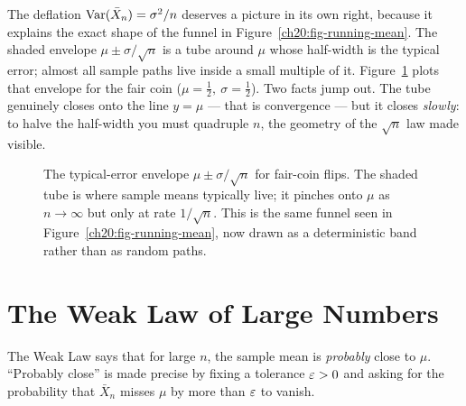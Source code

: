 The deflation $\operatorname{Var}(\bar X_n) = \sigma^2/n$ deserves a picture in its own right, because it explains the exact shape of the funnel in Figure~\ref{ch20:fig-running-mean}. The shaded envelope $\mu \pm \sigma/\sqrt n$ is a tube around $\mu$ whose half-width is the typical error; almost all sample paths live inside a small multiple of it. Figure~\ref{ch20:fig-funnel} plots that envelope for the fair coin ($\mu=\tfrac12,\ \sigma=\tfrac12$). Two facts jump out. The tube genuinely closes onto the line $y=\mu$ --- that is convergence --- but it closes \emph{slowly}: to halve the half-width you must quadruple $n$, the geometry of the $\sqrt n$ law made visible.

\begin{figure}[H]
\centering
{}
\caption{The typical-error envelope $\mu \pm \sigma/\sqrt n$ for fair-coin flips. The shaded tube is where sample means typically live; it pinches onto $\mu$ as $n\to\infty$ but only at rate $1/\sqrt n$. This is the same funnel seen in Figure~\ref{ch20:fig-running-mean}, now drawn as a deterministic band rather than as random paths.}
\label{ch20:fig-funnel}
\end{figure}

\section{The Weak Law of Large Numbers}
\label{ch20:wlln}

The Weak Law says that for large $n$, the sample mean is \emph{probably} close to $\mu$. ``Probably close'' is made precise by fixing a tolerance $\varepsilon > 0$ and asking for the probability that $\bar X_n$ misses $\mu$ by more than $\varepsilon$ to vanish.

